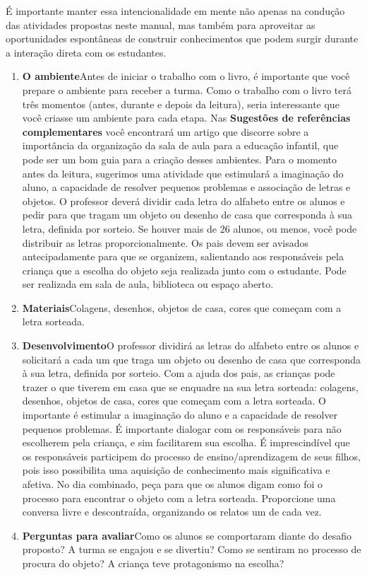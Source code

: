 \documentclass[11pt]{extarticle}
\begin{document}
É importante manter essa intencionalidade em mente não apenas na condução 
das atividades propostas neste manual, mas também para aproveitar as 
oportunidades espontâneas de construir conhecimentos que podem surgir durante 
a interação direta com os estudantes.

\begin{enumerate}
\item \textbf{O ambiente}\quad Antes de iniciar o trabalho com o livro, é importante que você 
prepare o ambiente para receber a turma. Como o trabalho com o livro terá 
três momentos (antes, durante e depois da leitura), seria interessante que você 
criasse um ambiente para cada etapa. Nas \textbf{Sugestões de referências complementares} 
você encontrará um artigo que discorre sobre a importância da organização da sala 
de aula para a educação infantil, que pode ser um bom guia para a criação desses 
ambientes.
Para o momento antes da leitura, sugerimos uma atividade que estimulará a imaginação do aluno, a capacidade de resolver pequenos problemas e associação de letras e objetos. O professor deverá dividir cada letra do alfabeto entre os alunos e pedir para que tragam um objeto ou desenho de casa que corresponda à sua letra, definida por sorteio. Se houver mais de 26 alunos, ou menos, você pode distribuir as letras proporcionalmente. Os pais devem ser avisados antecipadamente para que se organizem, salientando aos responsáveis pela criança que a escolha do objeto seja realizada junto com o estudante. Pode ser realizada em sala de aula, biblioteca ou espaço aberto.

\item \textbf{Materiais}\quad Colagens, desenhos, objetos de casa, cores que começam com a letra sorteada.

\item \textbf{Desenvolvimento}\quad O professor dividirá as letras do alfabeto entre os alunos e solicitará a cada um que traga um objeto ou desenho de casa que corresponda à sua letra, definida por sorteio. Com a ajuda dos pais, as crianças pode trazer o que tiverem em casa que se enquadre na sua letra sorteada: colagens, desenhos, objetos de casa, cores que começam com a letra sorteada. O importante é estimular a imaginação do aluno e a capacidade de resolver pequenos problemas. É importante dialogar com os responsáveis para não escolherem pela criança, e sim facilitarem sua escolha. É imprescindível que os responsáveis participem do processo de ensino/aprendizagem de seus filhos, pois isso possibilita uma aquisição de conhecimento mais significativa e afetiva. No dia combinado, peça para que os alunos digam como foi o processo para encontrar o objeto com a letra sorteada. Proporcione uma conversa livre e descontraída, organizando os relatos um de cada vez.

\item \textbf{Perguntas para avaliar}\quad Como os alunos se comportaram diante do desafio proposto? A turma se engajou e se divertiu? Como se sentiram no processo de procura do objeto? A criança teve protagonismo na escolha? 

\end{enumerate}
\end{document}
